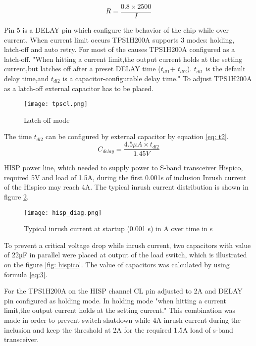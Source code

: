 \begin{equation}\label{eq: res}
R = \frac{0.8 \times 2500}{I}
\end{equation}


Pin 5 is a DELAY pin which configure the behavior of the chip while over current. When current limit occurs TPS1H200A supports 3 modes: holding, latch-off and auto retry. For most of the causes TPS1H200A configured as a latch-off. \cite{28} "When hitting a current limit,the output current holds at the setting current,but latches off after a preset DELAY time ($t_{dl1}$+ $t_{dl2}$). $t_{dl1}$ is the default delay time,and $t_{dl2}$ is a capacitor-configurable delay time." To adjust TPS1H200A as a latch-off external capacitor has to be placed. 

\begin{figure}[h]
	\centering
	\texttt{[image: tpscl.png]}
	\caption{Latch-off mode}
	\label{fig: tpscl}
\end{figure} 

The time $t_{dl2}$ can be configured by external capacitor by equation \ref{eq: t2}.  \\

\begin{equation} \label{eq: t2}
C_{delay} = \frac{4.5\mu A \times t_{dl2}}{1.45V} 
\end{equation}



 HISP power line, which needed to supply power to S-band transceiver Hispico, required 5V and load of 1.5A, during the first 0.001s of inclusion Inrush current of the Hispico may reach 4A. The typical inrush current distribution is shown in figure \ref{fig: hisp_inr}.

\begin{figure}[h]
	\centering
	\texttt{[image: hisp\_diag.png]}
	\caption{Typical inrush current at startup (0.001 s) in A over time in s}
	\label{fig: hisp_inr}
\end{figure} 

To prevent a critical voltage drop while inrush current, two capacitors with value of 22µF in parallel were placed at output of the load switch, which is illustrated on the figure \ref{fig: hispico}. The value of capacitors was calculated by using formula \ref{eq:3}.

For the TPS1H200A on the HISP channel CL pin adjusted to 2A and DELAY pin configured as holding mode. In holding mode \cite{28}"when hitting a current limit,the output current holds at the setting current." This combination was made in order to prevent switch shutdown while 4A inrush current during the inclusion and keep the threshold at 2A for the required 1.5A load of s-band transceiver. 
 
